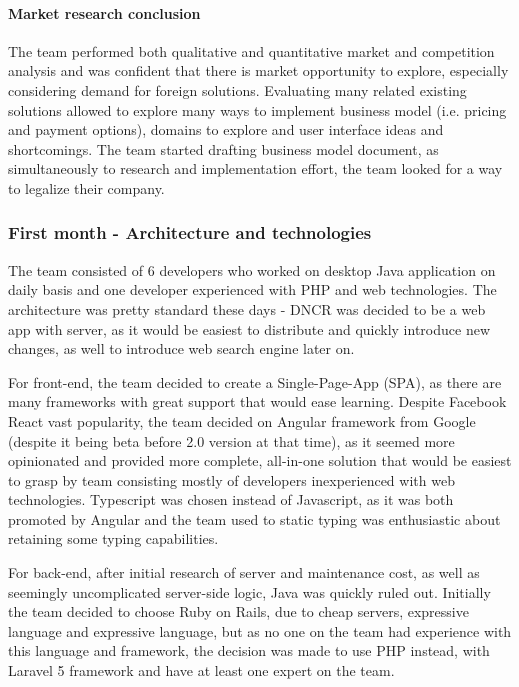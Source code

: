 \documentclass{article}
\begin{document}
\paragraph{Market research conclusion}
The team performed both qualitative and quantitative market and competition analysis and was confident that there is market opportunity to explore, especially considering demand for foreign solutions. Evaluating many related existing solutions allowed to explore many ways to implement business model (i.e. pricing and payment options), domains to explore and user interface ideas and shortcomings. The team started drafting business model document, as simultaneously to research and implementation effort, the team looked for a way to legalize their company.

\subsubsection{First month - Architecture and technologies}
The team consisted of 6 developers who worked on desktop Java application on daily basis and one developer experienced with PHP and web technologies. The architecture was pretty standard these days - DNCR was decided to be a web app with server, as it would be easiest to distribute and quickly introduce new changes, as well to introduce web search engine later on.

For front-end, the team decided to create a Single-Page-App (SPA), as there are many frameworks with great support that would ease learning. Despite Facebook React vast popularity, the team decided on Angular framework from Google (despite it being beta before 2.0 version at that time), as it seemed more opinionated and provided more complete, all-in-one solution that would be easiest to grasp by team consisting mostly of developers inexperienced with web technologies. Typescript was chosen instead of Javascript, as it was both promoted by Angular and the team used to static typing was enthusiastic about retaining some typing capabilities.

For back-end, after initial research of server and maintenance cost, as well as seemingly uncomplicated server-side logic, Java was quickly ruled out. Initially the team decided to choose Ruby on Rails, due to cheap servers, expressive language and expressive language, but as no one on the team had experience with this language and framework, the decision was made to use PHP instead, with Laravel 5 framework and have at least one expert on the team.
\end{document}
